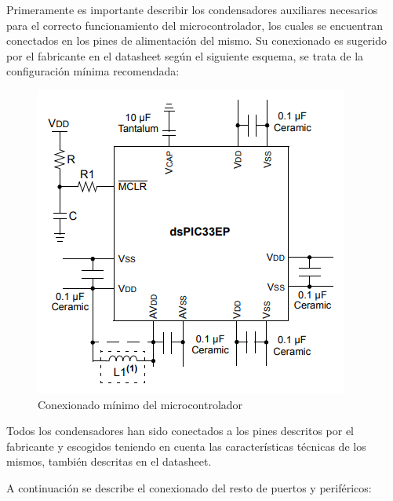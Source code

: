 Primeramente es importante describir los condensadores auxiliares necesarios para el correcto funcionamiento del microcontrolador, los cuales se encuentran conectados en los pines de alimentación del mismo. Su conexionado es sugerido por el fabricante en el datasheet según el siguiente esquema, se trata de la configuración mínima recomendada:

\begin{figure}[H]
    \centering 
    \includegraphics[width=.7\linewidth]{pictures/Minimun.PNG}
    \caption{Conexionado mínimo del microcontrolador}
    \label{fig:kdiagram}
\end{figure}

Todos los condensadores han sido conectados a los pines descritos por el fabricante y escogidos teniendo en cuenta las características técnicas de los mismos, también descritas en el datasheet.

A continuación se describe el conexionado del resto de puertos y periféricos:

